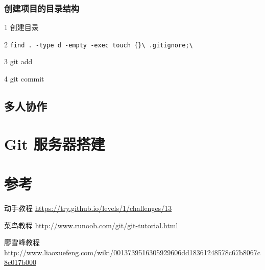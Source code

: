 \documentclass[UTF8,a4paper,12pt]{ctexbook}
\begin{document}
		  
		  \subsection{创建项目的目录结构}
			  1 创建目录 
			  
			  2 \verb|find . -type d -empty -exec touch {}\ .gitignore;\|
			  
			  3 git add
			  
			  4 git commit
	  
	  \section{多人协作}
	  
  \chapter{Git 服务器搭建}
  
  \chapter{参考}
		  动手教程 \url{https://try.github.io/levels/1/challenges/13}
		  
		  菜鸟教程  \url{http://www.runoob.com/git/git-tutorial.html}
		  
		  廖雪峰教程 \url{http://www.liaoxuefeng.com/wiki/0013739516305929606dd18361248578c67b8067c8c017b000}
\end{document}
